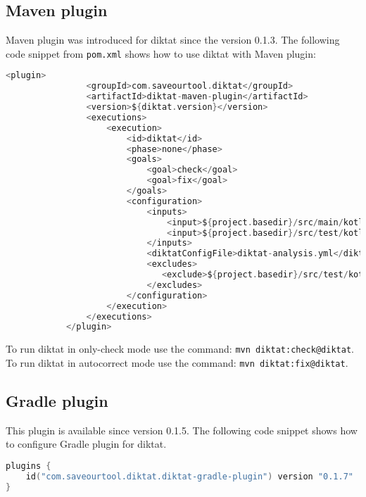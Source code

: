 \subsection{Maven plugin}
Maven plugin was introduced for diktat since the version 0.1.3. The following code snippet from \texttt{pom.xml} shows how to use diktat with Maven plugin:
\begin{lstlisting}[caption={DiKTat with Maven plugin}, label={lst:maven}, language=Kotlin]
          <plugin>
                <groupId>com.saveourtool.diktat</groupId>
                <artifactId>diktat-maven-plugin</artifactId>
                <version>${diktat.version}</version>
                <executions>
                    <execution>
                        <id>diktat</id>
                        <phase>none</phase>
                        <goals>
                            <goal>check</goal>
                            <goal>fix</goal>
                        </goals>
                        <configuration>
                            <inputs>
                                <input>${project.basedir}/src/main/kotlin</input>
                                <input>${project.basedir}/src/test/kotlin</input>
                            </inputs>
                            <diktatConfigFile>diktat-analysis.yml</diktatConfigFile>
                            <excludes>
                               <exclude>${project.basedir}/src/test/kotlin/excluded</exclude>
                            </excludes>
                        </configuration>
                    </execution>
                </executions>
            </plugin>
\end{lstlisting}

To run diktat in only-check mode use the command: \texttt{mvn diktat:check@diktat}. To run diktat in autocorrect mode use the command: \texttt{mvn diktat:fix@diktat}.


\subsection{Gradle plugin}
This plugin is available since version 0.1.5. The following code snippet shows how to configure Gradle plugin for diktat.

\begin{lstlisting}[caption={DiKTat with Gradle plugin}, label={lst:gradle1}, language=Kotlin]
plugins {
    id("com.saveourtool.diktat.diktat-gradle-plugin") version "0.1.7"
}
\end{lstlisting}

